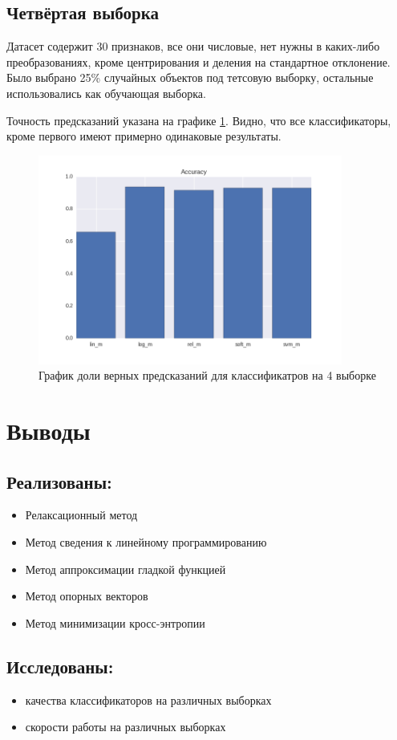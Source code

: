\documentclass[a4paper]{article}
\begin{document}
\subsection{Четвёртая выборка}
Датасет содержит 30 признаков, все они числовые, нет нужны в каких-либо преобразованиях, кроме центрирования и деления на стандартное отклонение. Было выбрано 25\% случайных объектов под тетсовую выборку, остальные использовались как обучающая выборка.

Точность предсказаний указана на графике \ref{pic:im5}. Видно, что все классификаторы, кроме первого имеют примерно одинаковые результаты.

\begin{figure}[H]
\centering
\includegraphics[width=10cm]{fifth_dataset}
\caption{График доли верных предсказаний для классификатров на 4 выборке}
\label{pic:im5}
\end{figure}

\section{Выводы}

\subsection{Реализованы:}
\begin{itemize}
\item Релаксационный метод
\item Метод сведения к линейному программированию
\item Метод аппроксимации гладкой функцией
\item Метод опорных векторов
\item Метод минимизации кросс-энтропии
\end{itemize}
\subsection{Исследованы:}
\begin{itemize}
\item качества классификаторов на различных выборках
\item скорости работы на различных выборках
\end{itemize}
\end{document}
